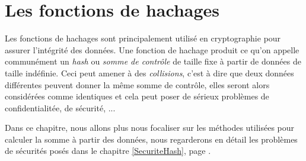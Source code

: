 \section{Les fonctions de hachages}
Les fonctions de hachages sont principalement utilisé en cryptographie
pour assurer l'intégrité des données. Une fonction de hachage produit
ce qu'on appelle communément un \emph{hash} ou \emph{somme de
  contrôle}  de taille fixe à partir de
données de taille indéfinie. Ceci peut amener à des \emph{collisions},
c'est à dire que deux données différentes peuvent donner la même somme
de contrôle, elles seront alors considérées comme identiques et cela
peut poser de sérieux problèmes de confidentialitée, de sécurité, ...

Dans ce chapitre, nous allons plus nous focaliser sur les méthodes
utilisées pour calculer la somme à partir des données, nous
regarderons en détail les problèmes de sécurités posés dans le
chapitre \ref{SecuriteHash}, page \pageref{SecuriteHash}.



